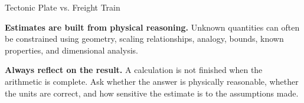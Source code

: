 \begin{activity}{Tectonic Plate vs. Freight Train}
\begin{minipage}[t]{0.58\textwidth}
\vspace{0.5em}
\textbf{Estimates are built from physical reasoning.} Unknown quantities can often be constrained using geometry, scaling relationships, analogy, bounds, known properties, and dimensional analysis.

\vspace{0.5em}
\textbf{Always reflect on the result.} A calculation is not finished when the arithmetic is complete. Ask whether the answer is physically reasonable, whether the units are correct, and how sensitive the estimate is to the assumptions made.

\end{minipage}

\end{activity}